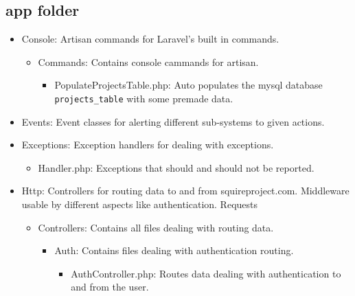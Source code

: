 \documentclass[11pt]{report}
\begin{document}

\subsection{app folder}
\begin{itemize}
    \item Console: Artisan commands for Laravel’s built in commands.
    \begin{itemize}
        \item Commands: Contains console cammands for artisan.
        \begin{itemize}
            \item PopulateProjectsTable.php: Auto populates the mysql database \texttt{projects\_table} with some premade data.
        \end{itemize}
    \end{itemize}
    \item Events: Event classes for alerting different sub-systems to given actions.
    \item Exceptions: Exception handlers for dealing with exceptions.
    \begin{itemize}
        \item Handler.php: Exceptions that should and should not be reported.
    \end{itemize}
        \item Http: Controllers for routing data to and from squireproject.com. Middleware usable by different aspects like authentication. Requests
    \begin{itemize}
        \item Controllers: Contains all files dealing with routing data.
        \begin{itemize}
            \item Auth: Contains files dealing with authentication routing.
            \begin{itemize}
                \item AuthController.php: Routes data dealing with authentication to and from the user.

\end{itemize}
\end{itemize}
\end{itemize}
\end{itemize}
\end{document}
